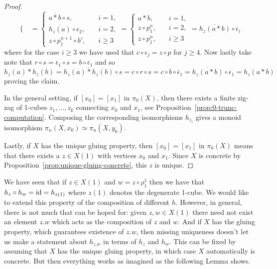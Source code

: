\begin{proof}
\[\begin{cases}
    \end{cases} =
    \begin{cases}
        \overline{a*b}\circ s,\quad & i = 1, \\
        \overline{h_z(a)}\circ\epsilon_2,\quad & i = 2, \\
        z\circ p_1^{n+1}\circ b',\quad & i \geq 3
    \end{cases} =
    \begin{cases}
        a*b,\quad & i = 1, \\
        z\circ p_1^n,\quad & i = 2, \\
        z\circ p_1^n,\quad & i\geq 3
    \end{cases} =
    \overline{h_z(a*b)}\circ\epsilon_i
\]
where for the case $i\geq 3$ we have used that $c\circ\epsilon_j = z\circ p$ for $j\geq 4$.
Now lastly take note that $r\circ s = \overline{\epsilon}_1\circ s = b\circ\overline{\epsilon}_1$ and so
\[
    h_z(a)*h_z(b) = \overline{h_z(a)*h_z(b)}\circ s = c\circ r\circ s = c\circ b\circ\overline{\epsilon}_1 = \overline{h_z(a*b)}\circ\overline{\epsilon}_1 = h_z(a*b)
\]
proving the claim.

In the general setting, if $[x_0]=[x_1]$ in $\pi_0(X)$,
then there exists a finite zig-zag of 1-cubes $z_1,\ldots,z_k$ connecting $x_0$ and $x_1$,
see Proposition~\ref{prop:0-trunc-computation}.
Composing the corresponding isomorphisms $h_{z_i}$ gives a monoid isomorphism $\pi_n(X,x_0)\simeq\pi_n(X,y_0)$.

Lastly, if $X$ has the unique gluing property, then $[x_0]=[x_1]$ in $\pi_0(X)$
means that there exists a $z\in X(1)$ with vertices $x_0$ and $x_1$.
Since $X$ is concrete by Proposition~\ref{prop:unique-gluing-concrete},
this $z$ is unique.
\end{proof}

We have seen that if $z\in X(1)$ and $w = z\circ\rho_1^1$ then we have that $h_z\circ h_w = \operatorname{id} = h_{z(1)}$ where $z(1)$ denotes the degenerate 1-cube.
We would like to extend this property of the composition of different $h$.
However, in general, there is not much that can be hoped for:
given $z,w\in X(1)$ there need not exist an element $z.w$ which acts as the composition of $z$ and $w$.
And if $X$ has the gluing property, which guarantees existence of $z.w$,
then missing uniqueness doesn't let us make a statement about $h_{z.w}$ in terms of $h_z$ and $h_w$.
This can be fixed by assuming that $X$ has the unique gluing property,
in which case $X$ automatically is concrete.
But then everything works as imagined as the following Lemma shows.

